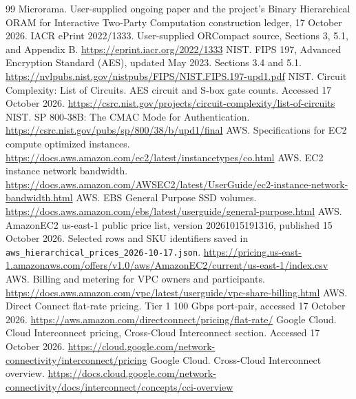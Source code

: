 \documentclass[11pt]{article}
\begin{document}
\clearpage
\begin{thebibliography}{99}
 Microrama. User-supplied ongoing paper and the
project's Binary Hierarchical ORAM for Interactive Two-Party Computation
construction ledger, 17 October 2026.
 IACR ePrint 2022/1333. User-supplied ORCompact source,
Sections 3, 5.1, and Appendix B. \url{https://eprint.iacr.org/2022/1333}
 NIST. FIPS 197, Advanced Encryption Standard (AES),
updated May 2023. Sections 3.4 and 5.1.
\url{https://nvlpubs.nist.gov/nistpubs/FIPS/NIST.FIPS.197-upd1.pdf}
 NIST. Circuit Complexity: List of Circuits. AES circuit
and S-box gate counts. Accessed 17 October 2026.
\url{https://csrc.nist.gov/projects/circuit-complexity/list-of-circuits}
 NIST. SP 800-38B: The CMAC Mode for Authentication.
\url{https://csrc.nist.gov/pubs/sp/800/38/b/upd1/final}
 AWS. Specifications for EC2 compute optimized instances.
\url{https://docs.aws.amazon.com/ec2/latest/instancetypes/co.html}
 AWS. EC2 instance network bandwidth.
\url{https://docs.aws.amazon.com/AWSEC2/latest/UserGuide/ec2-instance-network-bandwidth.html}
 AWS. EBS General Purpose SSD volumes.
\url{https://docs.aws.amazon.com/ebs/latest/userguide/general-purpose.html}
 AWS. AmazonEC2 us-east-1 public price list, version
20261015191316, published 15 October 2026. Selected rows and SKU identifiers
saved in \texttt{aws\_hierarchical\_prices\_2026-10-17.json}.
\url{https://pricing.us-east-1.amazonaws.com/offers/v1.0/aws/AmazonEC2/current/us-east-1/index.csv}
 AWS. Billing and metering for VPC owners and participants.
\url{https://docs.aws.amazon.com/vpc/latest/userguide/vpc-share-billing.html}
 AWS. Direct Connect flat-rate pricing.
Tier 1 100 Gbps port-pair, accessed 17 October 2026.
\url{https://aws.amazon.com/directconnect/pricing/flat-rate/}
 Google Cloud. Cloud Interconnect pricing,
Cross-Cloud Interconnect section. Accessed 17 October 2026.
\url{https://cloud.google.com/network-connectivity/interconnect/pricing}
 Google Cloud. Cross-Cloud Interconnect overview.
\url{https://docs.cloud.google.com/network-connectivity/docs/interconnect/concepts/cci-overview}
\end{thebibliography}
\end{document}
